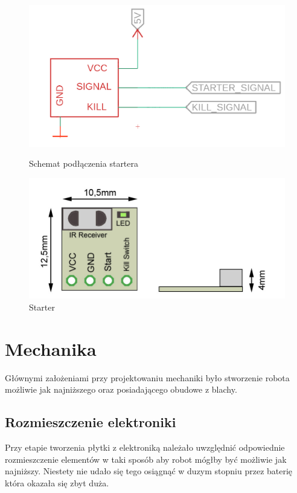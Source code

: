 \documentclass[polish,polish,a4paper]{article}
\begin{document}
    
    \begin{figure}[!htb]
       \begin{minipage}{0.3\textwidth}
         \centering
         \includegraphics[width=1.7\linewidth]{Scheme/start.png}
         \caption{Schemat podłączenia startera}\label{Fig:Data1}
       \end{minipage}
       \hspace{40mm}
       \begin{minipage}{0.3\textwidth}
         
         \includegraphics[width=1.6\linewidth]{photo/module-description_V0_03.jpg}
         \caption{Starter}\label{Fig:Data2}
         

       \end{minipage}
        \end{figure}
    \newpage
\section{Mechanika}
    Głównymi założeniami przy projektowaniu mechaniki było stworzenie robota możliwie jak najniższego oraz posiadającego obudowe z blachy. 
    
    
    \subsection{Rozmieszczenie elektroniki}
    Przy etapie tworzenia płytki z elektroniką należało uwzględnić odpowiednie rozmieszczenie elementów w taki sposób aby robot mógłby być możliwie jak najniższy. Niestety nie udało się tego osiągnąć w duzym stopniu przez baterię która okazała się zbyt duża. 
    
\end{document}
